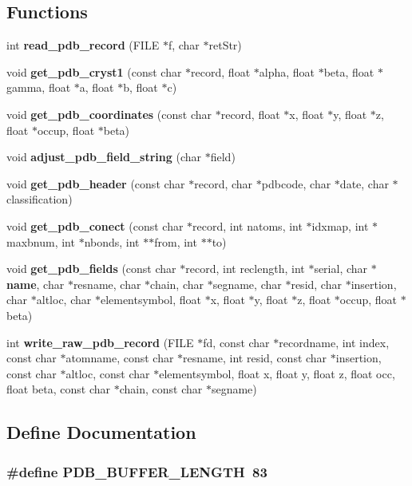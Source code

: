 \subsection*{Functions}
\begin{CompactItemize}
\item 
int {\bf read\_\-pdb\_\-record} (FILE $\ast$f, char $\ast$ret\-Str)
\item 
void {\bf get\_\-pdb\_\-cryst1} (const char $\ast$record, float $\ast$alpha, float $\ast$beta, float $\ast$gamma, float $\ast$a, float $\ast$b, float $\ast$c)
\item 
void {\bf get\_\-pdb\_\-coordinates} (const char $\ast$record, float $\ast$x, float $\ast$y, float $\ast$z, float $\ast$occup, float $\ast$beta)
\item 
void {\bf adjust\_\-pdb\_\-field\_\-string} (char $\ast$field)
\item 
void {\bf get\_\-pdb\_\-header} (const char $\ast$record, char $\ast$pdbcode, char $\ast$date, char $\ast$classification)
\item 
void {\bf get\_\-pdb\_\-conect} (const char $\ast$record, int natoms, int $\ast$idxmap, int $\ast$maxbnum, int $\ast$nbonds, int $\ast$$\ast$from, int $\ast$$\ast$to)
\item 
void {\bf get\_\-pdb\_\-fields} (const char $\ast$record, int reclength, int $\ast$serial, char $\ast${\bf name}, char $\ast$resname, char $\ast$chain, char $\ast$segname, char $\ast$resid, char $\ast$insertion, char $\ast$altloc, char $\ast$elementsymbol, float $\ast$x, float $\ast$y, float $\ast$z, float $\ast$occup, float $\ast$beta)
\item 
int {\bf write\_\-raw\_\-pdb\_\-record} (FILE $\ast$fd, const char $\ast$recordname, int index, const char $\ast$atomname, const char $\ast$resname, int resid, const char $\ast$insertion, const char $\ast$altloc, const char $\ast$elementsymbol, float x, float y, float z, float occ, float beta, const char $\ast$chain, const char $\ast$segname)
\end{CompactItemize}


\subsection{Define Documentation}
\subsubsection{\setlength{\rightskip}{0pt plus 5cm}\#define PDB\_\-BUFFER\_\-LENGTH\ 83}\label{readpdb_8h_a1}





